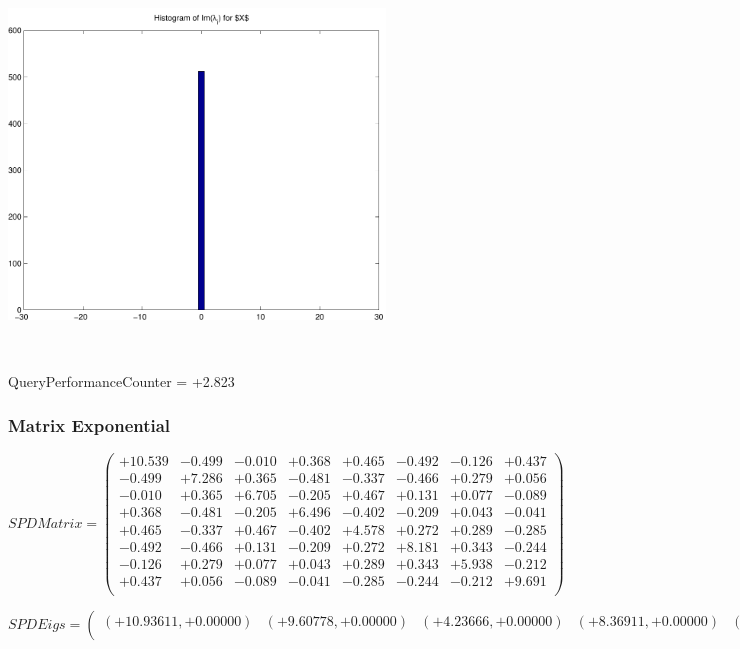 \documentclass[9pt]{article}
\theoremstyle{plain}
\theoremstyle{definition}
\theoremstyle{remark}
\numberwithin{equation}{section}
\begin{document}
\includegraphics[width=10.0cm,height=10.0cm]{Im_lambda_n.pdf}

QueryPerformanceCounter  =  +2.823
\subsubsection{Matrix Exponential }
$SPD Matrix = \left(
\begin{array}{
cccccccc}
+10.539 & -0.499 & -0.010 & +0.368 & +0.465 & -0.492 & -0.126 & +0.437 \\
-0.499 & +7.286 & +0.365 & -0.481 & -0.337 & -0.466 & +0.279 & +0.056 \\
-0.010 & +0.365 & +6.705 & -0.205 & +0.467 & +0.131 & +0.077 & -0.089 \\
+0.368 & -0.481 & -0.205 & +6.496 & -0.402 & -0.209 & +0.043 & -0.041 \\
+0.465 & -0.337 & +0.467 & -0.402 & +4.578 & +0.272 & +0.289 & -0.285 \\
-0.492 & -0.466 & +0.131 & -0.209 & +0.272 & +8.181 & +0.343 & -0.244 \\
-0.126 & +0.279 & +0.077 & +0.043 & +0.289 & +0.343 & +5.938 & -0.212 \\
+0.437 & +0.056 & -0.089 & -0.041 & -0.285 & -0.244 & -0.212 & +9.691 \\
\end{array}
\right)$ \newline 

$SPD Eigs = \left(
\begin{array}{
cccccccc}
(+10.93611,+0.00000) & (+9.60778,+0.00000) & (+4.23666,+0.00000) & (+8.36911,+0.00000) & (+7.56229,+0.00000) & (+5.82791,+0.00000) & (+6.54198,+0.00000) & (+6.33139,+0.00000) \\
\end{array}
\right)$ \newline 
\end{document}
